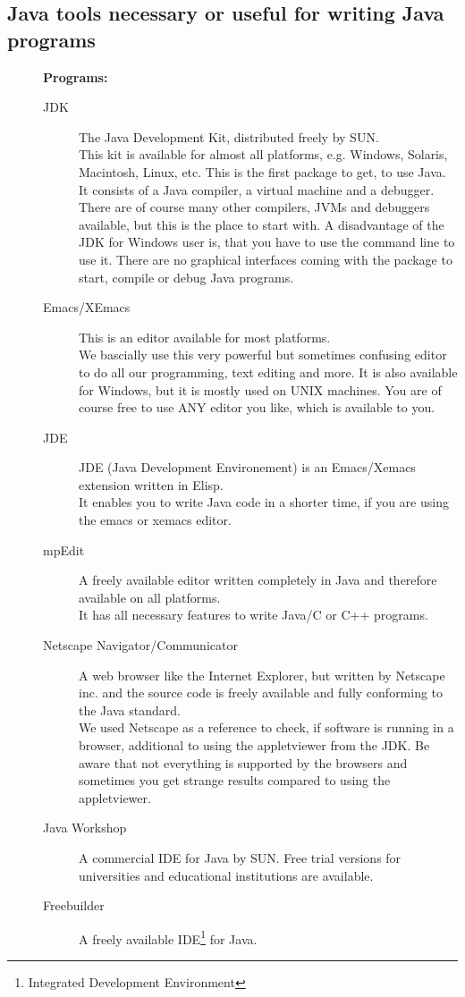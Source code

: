 \subsection{Java tools necessary or useful for writing Java programs}
\begin{description}
\item[] \textbf{Programs:} 
\begin{description}
\item[JDK] The Java Development Kit, distributed freely by SUN.\\
        This kit is available for almost all platforms, e.g. Windows,
        Solaris, Macintosh, Linux, etc. This is the first package to get,
        to use Java. It consists of a Java compiler, a virtual machine 
        and a debugger. There
        are of course many other compilers, JVMs and debuggers
        available, but this is the place to start with. A disadvantage
        of the JDK for Windows user is, that you have to use the
        command line to use it. There are no graphical interfaces  coming with the
        package to start, compile or debug Java programs.
\item[Emacs/XEmacs] This is an editor available for most platforms.\\
        We bascially use this very powerful but sometimes confusing
        editor to do all our programming, text editing and more. It is
        also available for Windows, but it is mostly used on UNIX machines.
        You are of course free to use ANY editor you like, which is available
        to you. 
\item[JDE] JDE (Java Development Environement) is an Emacs/Xemacs extension
        written in Elisp. \\
        It enables you to write Java code in a shorter time, if you are
        using the emacs or xemacs editor. 
\item[mpEdit] A freely available editor written completely in Java and
  therefore available on all platforms.\\ 
  It has all necessary features to write Java/C or C++ programs.
\item[Netscape Navigator/Communicator] A web browser like the Internet 
        Explorer, but written by Netscape inc. and the source code is
        freely available and fully conforming to the Java standard. \\
        We used Netscape as a reference to check, if software is running
        in a browser, additional to using the appletviewer from the JDK.
        Be aware that not everything is supported by the browsers and
        sometimes you get strange results compared to using the
        appletviewer.       
\item[Java Workshop] A commercial IDE for Java by SUN. Free trial versions
  for universities and educational institutions are available.\\  
\item[Freebuilder] A freely available IDE\footnote{Integrated Development
    Environment} for Java. \\
\end{description}


\end{description}
